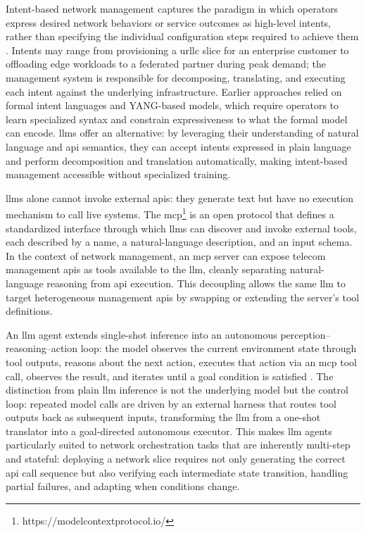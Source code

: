 Intent-based network management captures the paradigm in which operators express desired network behaviors or service outcomes as high-level intents, rather than specifying the individual configuration steps required to achieve them \cite{GharbaouiIntentBasedNetworkingCurrentAdvancesOpen2023}. Intents may range from provisioning a \ac{urllc} slice for an enterprise customer to offloading edge workloads to a federated partner during peak demand; the management system is responsible for decomposing, translating, and executing each intent against the underlying infrastructure. Earlier approaches relied on formal intent languages and \mbox{YANG}-based models, which require operators to learn specialized syntax and constrain expressiveness to what the formal model can encode. \acp{llm} offer an alternative: by leveraging their understanding of natural language and \ac{api} semantics, they can accept intents expressed in plain language and perform decomposition and translation automatically, making intent-based management accessible without specialized training.

\acp{llm} alone cannot invoke external \acp{api}: they generate text but have no execution mechanism to call live systems. The \acf{mcp}\footnote{https://modelcontextprotocol.io/} is an open protocol that defines a standardized interface through which \acp{llm} can discover and invoke external tools, each described by a name, a natural-language description, and an input schema. In the context of network management, an \ac{mcp} server can expose telecom management \acp{api} as tools available to the \ac{llm}, cleanly separating natural-language reasoning from \ac{api} execution. This decoupling allows the same \ac{llm} to target heterogeneous management \acp{api} by swapping or extending the server's tool definitions.

An \ac{llm} agent extends single-shot inference into an autonomous perception--reasoning--action loop: the model observes the current environment state through tool outputs, reasons about the next action, executes that action via an \ac{mcp} tool call, observes the result, and iterates until a goal condition is satisfied \cite{WangSurveyLargeLanguageModelbasedAutonomousAgents2024}. The distinction from plain \ac{llm} inference is not the underlying model but the control loop: repeated model calls are driven by an external harness that routes tool outputs back as subsequent inputs, transforming the \ac{llm} from a one-shot translator into a goal-directed autonomous executor. This makes \ac{llm} agents particularly suited to network orchestration tasks that are inherently multi-step and stateful: deploying a network slice requires not only generating the correct \ac{api} call sequence but also verifying each intermediate state transition, handling partial failures, and adapting when conditions change.

